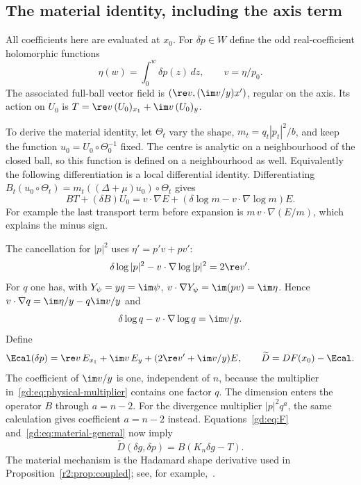 \subsection{The material identity, including the axis term}
\label{gd:sec:material}
All coefficients here are evaluated at $x_0$.
For $\delta p\in W$ define the odd real-coefficient holomorphic functions
\[
 \eta(w)=\int_0^w\delta p(z)\,dz,\qquad v=\eta/p_0 .
\]
The associated full-ball vector field is
$(\re v,(\im v/y)x')$, regular on the axis.
Its action on $U_0$ is $T=\re v\,(U_0)_{x_1}+\im v\,(U_0)_y$.

To derive the material identity, let $\Theta_t$ vary the shape,
$m_t=q_t|p_t|^2/b$, and keep the function
$u_0=U_0\circ\Theta_0^{-1}$ fixed.
The centre is analytic on a neighbourhood of the closed ball, so this
function is defined on a neighbourhood as well.
Equivalently the following differentiation is a local differential
identity. Differentiating
$B_t(u_0\circ\Theta_t)=m_t((\Delta+\mu)u_0)\circ\Theta_t$ gives
\begin{equation}\label{gd:eq:material-general}
 BT+(\delta B)U_0
 =v\cdot\nabla E+(\delta\log m-v\cdot\nabla\log m)E .
\end{equation}
For example the last transport term before expansion is
$m\,v\cdot\nabla(E/m)$, which explains the minus sign.

The cancellation for $|p|^2$ uses $\eta'=p'v+pv'$:
\[
 \delta\log|p|^2-v\cdot\nabla\log|p|^2=2\re v'.
\]
For $q$ one has, with $Y_\psi=yq=\im\psi$,
$v\cdot\nabla Y_\psi=\im(pv)=\im\eta$.
Hence $v\cdot\nabla q=\im\eta/y-q\im v/y$ and
\[
 \delta\log q-v\cdot\nabla\log q=\im v/y .
\]
Define
\begin{equation}\label{gd:eq:correction}
 \Ecal(\delta p)=\re v\,E_{x_1}+\im v\,E_y
                         +(2\re v'+\im v/y)E,\qquad
 \widetilde D=DF(x_0)-\Ecal .
\end{equation}
The coefficient of $\im v/y$ is one, independent of $n$, because
the multiplier in~\eqref{gd:eq:physical-multiplier} contains one factor
$q$. The dimension enters the operator $B$ through $a=n-2$.
For the divergence multiplier $|p|^2q^a$, the same calculation gives
coefficient $a=n-2$ instead.
Equations~\eqref{gd:eq:F} and~\eqref{gd:eq:material-general} now imply
\begin{equation}\label{gd:eq:corrected-factor}
 \widetilde D(\delta g,\delta p)=B(K_n\delta g-T).
\end{equation}
The material mechanism is the Hadamard shape derivative used in
Proposition~\ref{r2:prop:coupled}; see, for example,~\cite{SZ92,HP18}.

